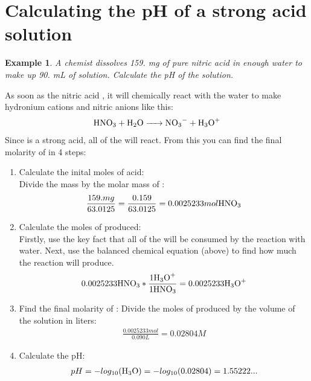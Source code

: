\documentclass{article}  %
\newtheorem{exmp}{Example}
\begin{document}
\section*{Calculating the pH of a strong acid solution}
\begin{exmp}
    A chemist dissolves 159. mg of pure nitric acid in enough water to make up 90. mL of solution. Calculate the pH of the solution.
\end{exmp}
As soon as the nitric acid , it will chemically react with the water to make hydronium cations and nitric anions like this:
\begin{equation*}
    \begin{aligned}
        \ce{HNO3 + H2O -> NO3- + H3O+}
    \end{aligned}
\end{equation*}
Since  is a strong acid, all of the  will react. From this you can find the final molarity of  in 4 steps:
\begin{enumerate}
    \item Calculate the inital moles of acid: \\
    Divide the mass by the molar mass of :
    \begin{equation*}
        \begin{aligned}
            \frac{159.mg}{63.0125} = \frac{0.159}{63.0125} = 0.0025233 mol \ce{HNO3}
        \end{aligned}
    \end{equation*}
    \item Calculate the moles of  produced: \\
    Firstly, use the key fact that all of the  will be consumed by the reaction with water. Next, use the balanced chemical equation (above) to find how much  the reaction will produce. 
    \begin{equation*}
        \begin{aligned}
            0.0025233\ce{HNO3} * \frac{1 \ce{H3O+}}{1 \ce{HNO3}} = 0.0025233 \ce{H3O+}
        \end{aligned}
    \end{equation*}
    \item Find the final molarity of :
    Divide the moles of  produced by the volume of the solution in liters:
    \begin{equation*}
        \begin{aligned}
            \frac{0.0025233mol}{0.090L} = 0.02804M
        \end{aligned}
    \end{equation*}
    \item Calculate the pH:
    \begin{equation*}
        \begin{aligned}
            pH = -log_{10}(\ce{H3O}) = -log_{10}(0.02804) = 1.55222...
        \end{aligned}
    \end{equation*}
\end{enumerate}
\end{document}

